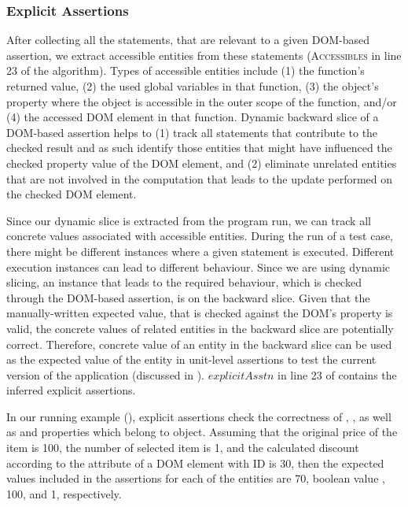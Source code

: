 \subsubsection{Explicit Assertions} \label{Sec:explicitAssertions}
After collecting all the statements, that are relevant to a given DOM-based assertion, we extract accessible entities from these statements (\textsc{Accessibles} in line 23 of the algorithm).
Types of accessible entities include (1) the function's returned value, (2) the used global variables in that function, (3) the object's property where the object is accessible in the outer scope of the function, and/or (4) the accessed DOM element in that function. Dynamic backward slice of a DOM-based assertion helps to (1) track all statements that contribute to the checked result and as such identify those entities that might have influenced the checked property value of the DOM element, and (2) eliminate unrelated entities that are not involved in the computation that leads to the update performed on the checked DOM element.

Since our dynamic slice is extracted from the program run, we can track all concrete values associated with accessible entities.
During the run of a test case, there might be different instances where a given statement is executed. Different execution instances can lead to different behaviour. Since we are using dynamic slicing, an instance that leads to the required behaviour, which is checked through the DOM-based assertion, is on the backward slice. Given that the manually-written expected value, that is checked against the DOM's property is valid, the concrete values of related entities in the backward slice are potentially correct. Therefore, concrete value of an entity in the backward slice can be used as the expected value of the entity in unit-level assertions to test the current version of the application (discussed in ).
$explicitAsstn$ in line 23 of  contains the inferred explicit assertions.

In our running example (), explicit assertions check the correctness of , , as well as  and  properties which belong to  object.  
Assuming that the original price of the item is 100, the number of selected item is 1, and the calculated discount according to the  attribute of a DOM element with ID  is 30, then the expected values included in the assertions for each of the entities are 70, boolean value , 100, and 1, respectively.  

